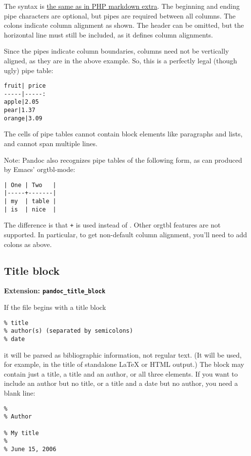 \documentclass[]{article}
\begin{document}
The syntax is
\href{http://michelf.ca/projects/php-markdown/extra/\#table}{the same as
in PHP markdown extra}. The beginning and ending pipe characters are
optional, but pipes are required between all columns. The colons
indicate column alignment as shown. The header can be omitted, but the
horizontal line must still be included, as it defines column alignments.

Since the pipes indicate column boundaries, columns need not be
vertically aligned, as they are in the above example. So, this is a
perfectly legal (though ugly) pipe table:

\begin{verbatim}
fruit| price
-----|-----:
apple|2.05
pear|1.37
orange|3.09
\end{verbatim}

The cells of pipe tables cannot contain block elements like paragraphs
and lists, and cannot span multiple lines.

Note: Pandoc also recognizes pipe tables of the following form, as can
produced by Emacs' orgtbl-mode:

\begin{verbatim}
| One | Two   |
|-----+-------|
| my  | table |
| is  | nice  |
\end{verbatim}

The difference is that \texttt{+} is used instead of
\texttt{\textbar{}}. Other orgtbl features are not supported. In
particular, to get non-default column alignment, you'll need to add
colons as above.

\subsection{Title block}\label{title-block}

\textbf{Extension: \texttt{pandoc\_title\_block}}

If the file begins with a title block

\begin{verbatim}
% title
% author(s) (separated by semicolons)
% date
\end{verbatim}

it will be parsed as bibliographic information, not regular text. (It
will be used, for example, in the title of standalone LaTeX or HTML
output.) The block may contain just a title, a title and an author, or
all three elements. If you want to include an author but no title, or a
title and a date but no author, you need a blank line:

\begin{verbatim}
%
% Author

% My title
%
% June 15, 2006
\end{verbatim}
\end{document}
